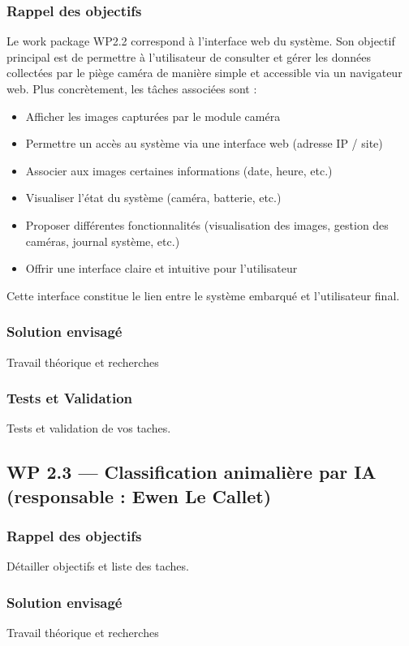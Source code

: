 ﻿\documentclass[11pt]{article}
\begin{document}
\subsubsection{Rappel des objectifs}
Le work package WP2.2 correspond à l’interface web du système.
Son objectif principal est de permettre à l’utilisateur de consulter et gérer les données collectées par le piège caméra de manière simple et accessible via un navigateur web.
Plus concrètement, les tâches associées sont :
\begin{itemize}
\item Afficher les images capturées par le module caméra
\item Permettre un accès au système via une interface web (adresse IP / site)
\item Associer aux images certaines informations (date, heure, etc.)
\item Visualiser l’état du système (caméra, batterie, etc.)
\item Proposer différentes fonctionnalités (visualisation des images, gestion des caméras, journal système, etc.)
\item Offrir une interface claire et intuitive pour l’utilisateur
\end{itemize}
Cette interface constitue le lien entre le système embarqué et l’utilisateur final.

\subsubsection{Solution envisagé}
Travail théorique et recherches
\subsubsection{Tests et Validation}
Tests et validation de vos taches.

\subsection{WP 2.3 — Classification animalière par IA (responsable : Ewen Le Callet)}
\subsubsection{Rappel des objectifs}
Détailler objectifs et liste des taches.
\subsubsection{Solution envisagé}
Travail théorique et recherches
\end{document}
